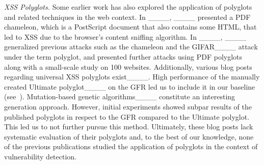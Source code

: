 \textit{XSS Polyglots.}
Some earlier work has also explored the application of polyglots and related techniques in the web context.
In ____, ____ presented a PDF chameleon, which is a PostScript document that also contains some HTML, that led to XSS due to the browser's content sniffing algorithm.
In ____, ____ generalized previous attacks such as the chameleon and the GIFAR____ attack under the term polyglot, and presented further attacks using PDF polyglots along with a small-scale study on 100 websites.
Additionally, various blog posts regarding universal XSS polyglots exist____.
High performance of the manually created Ultimate polyglot____ on the GFR led us to include it in our baseline (see~).
Mutation-based genetic algorithms____ constitute an interesting generation approach.
However, initial experiments showed subpar results of the published polyglots in respect to the GFR compared to the Ultimate polyglot.
This led us to not further pursue this method.
Ultimately, these blog posts lack systematic evaluation of their polyglots and, to the best of our knowledge, none of the previous publications studied the application of polyglots in the context of \blindxss{} vulnerability detection. %